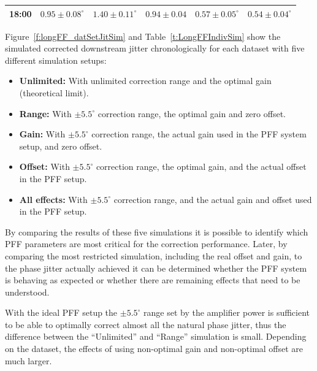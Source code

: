 {\begin{minipage}{\linewidth}
\begin{tabular}{| c  c  c  c  c  c  |}
18:00 & \(0.95\pm0.08^\circ\) & \(1.40\pm0.11^\circ\) & \(0.94\pm0.04\) & \(0.57\pm0.05^\circ\) & \(0.54\pm0.04^\circ\) \\ \hline
    \end{tabular}
  	\label{t:LongFFIndiv}
\end{minipage}
\pagebreak
}


Figure~\ref{f:longFF_datSetJitSim} and Table~\ref{t:LongFFIndivSim} show the simulated corrected downstream jitter chronologically for each dataset with five different simulation setups:
\begin{itemize}
\item \textbf{Unlimited:} With unlimited correction range and the optimal gain (theoretical limit).
\item \textbf{Range:} With \(\pm5.5^\circ\) correction range, the optimal gain and zero offset.
\item \textbf{Gain:} With \(\pm5.5^\circ\) correction range, the actual gain used in the PFF system setup, and zero offset.
\item \textbf{Offset:} With \(\pm5.5^\circ\) correction range, the optimal gain, and the actual offset in the PFF setup.
\item \textbf{All effects:} With \(\pm5.5^\circ\) correction range, and the actual gain and offset used in the PFF setup.
\end{itemize}

By comparing the results of these five simulations it is possible to identify which PFF parameters are most critical for the correction performance. Later, by comparing the most restricted simulation, including the real offset and gain, to the phase jitter actually achieved it can be determined whether the PFF system is behaving as expected or whether there are remaining effects that need to be understood.

With the ideal PFF setup the \(\pm5.5^\circ\) range set by the amplifier power is sufficient to be able to optimally correct almost all the natural phase jitter, thus the difference between the ``Unlimited'' and ``Range'' simulation is small. Depending on the dataset, the effects of using non-optimal gain and non-optimal offset are much larger.

%

